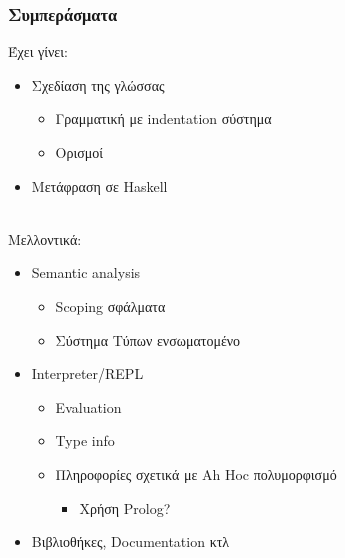 \documentclass{beamer}
\def\e{\foreignlanguage{english}}
\def\h{\e{Haskell}}
\begin{document}
\begin{frame}

\frametitle{Συμπεράσματα}

Έχει γίνει:
\begin{itemize}
\item Σχεδίαση της γλώσσας

\begin{itemize}
\item Γραμματική με \e{indentation} σύστημα

\item Ορισμοί

\end{itemize}

\item Μετάφραση σε \h
\\~\

\end{itemize}

\pause
Μελλοντικά:
\begin{itemize}
\item \e{Semantic analysis}

\begin{itemize}

\item \e{Scoping} σφάλματα

\item Σύστημα Τύπων ενσωματομένο

\end{itemize}

\item \e{Interpreter/REPL}

\begin{itemize}

\item \e{Evaluation}

\item \e{Type info}

\item Πληροφορίες σχετικά με \e{Ah Hoc} πολυμορφισμό

\begin{itemize}

\item Χρήση \e{Prolog}?

\end{itemize}

\end{itemize}

\item Βιβλιοθήκες, \e{Documentation} κτλ

\end{itemize}

\end{frame}
\end{document}
